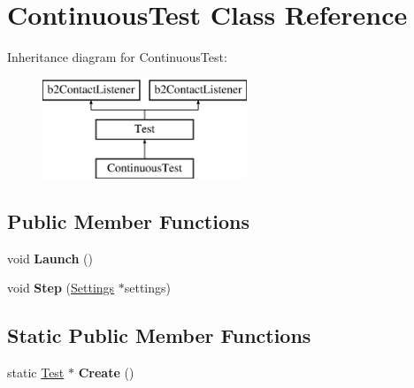 \hypertarget{class_continuous_test}{\section{Continuous\-Test Class Reference}
\label{class_continuous_test}
}
Inheritance diagram for Continuous\-Test\-:\begin{figure}[H]
\begin{center}
\leavevmode
\includegraphics[height=3.000000cm]{class_continuous_test}
\end{center}
\end{figure}
\subsection*{Public Member Functions}
\begin{DoxyCompactItemize}
\item 
\hypertarget{class_continuous_test_a1389a74d1c5dcafd2dcf23df29e2a159}{void {\bfseries Launch} ()}\label{class_continuous_test_a1389a74d1c5dcafd2dcf23df29e2a159}

\item 
\hypertarget{class_continuous_test_af09fb48c291a2d05a9ff1c092a8f2bde}{void {\bfseries Step} (\hyperlink{struct_settings}{Settings} $\ast$settings)}\label{class_continuous_test_af09fb48c291a2d05a9ff1c092a8f2bde}

\end{DoxyCompactItemize}
\subsection*{Static Public Member Functions}
\begin{DoxyCompactItemize}
\item 
\hypertarget{class_continuous_test_a76f5ff1c2a8b98d603033cd7fa6804f4}{static \hyperlink{class_test}{Test} $\ast$ {\bfseries Create} ()}\label{class_continuous_test_a76f5ff1c2a8b98d603033cd7fa6804f4}

\end{DoxyCompactItemize}
